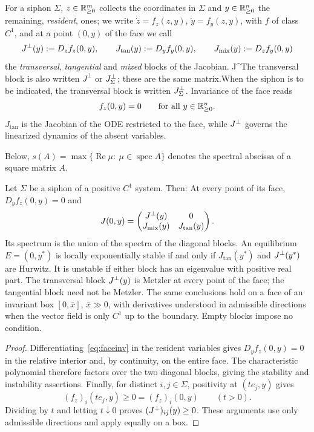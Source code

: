For a   siphon $\Sigma$, $z\in\mathbb{R}^m_{\ge0}$ collects the coordinates in
$\Sigma$ and $y\in\mathbb{R}^n_{\ge0}$ the remaining, \emph{resident}, ones; we write
$\dot z=f_z(z,y)$, $\dot y=f_y(z,y)$, with $f$ of class $C^1$, and at a point
$(0,y)$ of the face we call
\[
J^\perp(y):=D_zf_z(0,y),\qquad J_{\mathrm{tan}}(y):=D_yf_y(0,y),\qquad
J_{\mathrm{mix}}(y):=D_zf_y(0,y)
\]
the \emph{transversal}, \emph{tangential} and \emph{mixed} blocks of the
Jacobian. %
\providecommand{\SiInJdefault}{J^\perp}\ifx\Jtr\SiInJdefault The transversal block is also written $J^\perp$ or
$J_{\Sigma}^\perp$; these are the same matrix.\else When the siphon is to be indicated, the transversal block is
written $J_{\Sigma}^\perp$.\fi{} Invariance of the face reads
\begin{equation}\label{eq:faceinv}
f_z(0,y)=0\qquad\text{for all } y\in\mathbb{R}^n_{\ge0}.
\end{equation} $J_{\mathrm{tan}}$ is the Jacobian of the ODE restricted to the face,
while $J^\perp$ governs the linearized dynamics of the absent variables.



Below, $s(A)=\max\{\operatorname{Re}\mu:\ \mu\in\operatorname{spec}A\}$ denotes the
spectral abscissa of a square matrix $A$.

\label{p:Sta}
Let $\Sigma$ be a siphon of a positive $C^1$ system. Then:
\BEN
\im At every point of its face, $D_yf_z(0,y)=0$ and
\begin{equation}\label{eq:blocks}
J(0,y)=
\begin{pmatrix}
J^\perp(y)&0\\
J_{\mathrm{mix}}(y)&J_{\mathrm{tan}}(y)
\end{pmatrix}.
\end{equation}
Its spectrum is the union of the spectra of the diagonal blocks.
\im An equilibrium $E=(0,y^*)$ is locally exponentially stable if and only if
$J_{\mathrm{tan}}(y^*)$ and $J^\perp(y^*)$ are Hurwitz. It is unstable if either
block has an eigenvalue with positive real part.
\im The transversal block $J^\perp(y)$ is Metzler at every point of the face;
the tangential block need not be Metzler.
\EEN
The same conclusions hold on a face of an invariant box $[0,\bar x]$, $\bar x\gg0$,
with derivatives understood in admissible directions when the vector field
is only $C^1$ up to the boundary. Empty blocks impose no condition.
\eeP
\begin{proof}
Differentiating~\eqref{eq:faceinv} in the resident variables gives
$D_yf_z(0,y)=0$ in the relative interior and, by continuity, on the entire
face. The characteristic polynomial therefore factors over the two diagonal
blocks, giving the stability and instability assertions. Finally, for distinct $i,j\in\Sigma$, positivity at $(te_j,y)$ gives
\[
(f_z)_i(te_j,y)\ge0=(f_z)_i(0,y)\qquad(t>0).
\]
Dividing by $t$ and letting $t\downarrow0$ proves
$(J^\perp)_{ij}(y)\ge0$. These arguments use only admissible directions and
apply equally on a box.
\end{proof}


